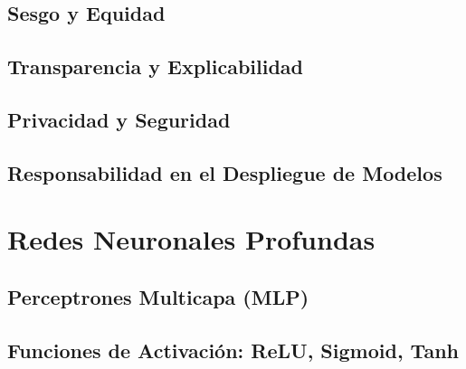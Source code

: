 \documentclass[12pt]{article}
\begin{document}
\subsection{Sesgo y Equidad}
\newpage
\subsection{Transparencia y Explicabilidad}
\newpage
\subsection{Privacidad y Seguridad}
\newpage
\subsection{Responsabilidad en el Despliegue de Modelos}
\newpage


\section{Redes Neuronales Profundas}


\subsection{Perceptrones Multicapa (MLP)}
\newpage
\subsection{Funciones de Activación: ReLU, Sigmoid, Tanh}
\newpage
\end{document}
